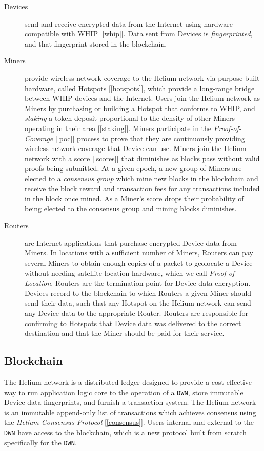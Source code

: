\documentclass[10pt, nonatbib, nocopyrightspace, reprint]{sigplanconf}
\newcommand{\secref}[1]{[\autoref{#1}]}
\begin{document}
\begin{description}
    \item [Devices] send and receive encrypted data from the Internet using hardware compatible with WHIP \secref{whip}. Data sent from Devices is \emph{fingerprinted}, and that fingerprint stored in the blockchain.
    \item [Miners] provide wireless network coverage to the Helium network via purpose-built hardware, called Hotspots \secref{hotspots}, which provide a long-range bridge between WHIP devices and the Internet. Users join the Helium network as Miners by purchasing or building a Hotspot that conforms to WHIP, and \emph{staking} a token deposit proportional to the density of other Miners operating in their area \secref{staking}. Miners participate in the \emph{Proof-of-Coverage} \secref{poc} process to prove that they are continuously providing wireless network coverage that Device can use. Miners join the Helium network with a score \secref{scores} that diminishes as blocks pass without valid proofs being submitted. At a given epoch, a new group of Miners are elected to a \emph{consensus group} which mine new blocks in the blockchain and receive the block reward and transaction fees for any transactions included in the block once mined. As a Miner's score drops their probability of being elected to the consensus group and mining blocks diminishes.
    \item [Routers] are Internet applications that purchase encrypted Device data from Miners. In locations with a sufficient number of Miners, Routers can pay several Miners to obtain enough copies of a packet to geolocate a Device without needing satellite location hardware, which we call \emph{Proof-of-Location}.  Routers are the termination point for Device data encryption. Devices record to the blockchain to which Routers a given Miner should send their data, such that any Hotspot on the Helium network can send any Device data to the appropriate Router. Routers are responsible for confirming to Hotspots that Device data was delivered to the correct destination and that the Miner should be paid for their service.
\end{description}

\subsection{Blockchain} \label{blockchain}

The Helium network is a distributed ledger designed to provide a cost-effective way to run application logic core to the operation of a \verb|DWN|, store immutable Device data fingerprints, and furnish a transaction system. The Helium network is an immutable append-only list of transactions which achieves consensus using the \emph{Helium Consensus Protocol} \secref{consensus}. Users internal and external to the \verb|DWN| have access to the blockchain, which is a new protocol built from scratch specifically for the \verb|DWN|.
\end{document}
